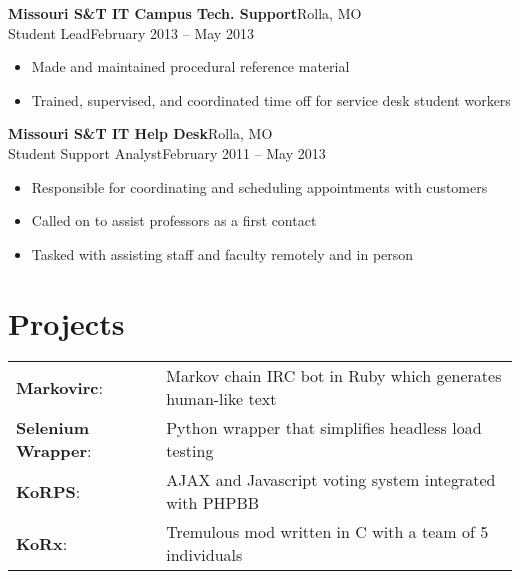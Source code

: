 \documentclass[margin]{res}
\newcommand{\github}[0]%
{%
  \hspace{-4mm}\faGithubSign\hspace{1mm}%
}
\begin{document}
\begin{resume}
       \textbf{Missouri S\&T IT Campus Tech. Support}\hfill  Rolla, MO\\
       Student Lead\hfill February 2013 -- May 2013
       \begin{itemize} \itemsep -1pt  %
         \item Made and maintained procedural reference material
         \item Trained, supervised, and coordinated time off for service desk student workers
       \end{itemize}
     
       \textbf{Missouri S\&T IT Help Desk}\hfill Rolla, MO\\
       Student Support Analyst\hfill February 2011 -- May 2013
       \begin{itemize} \itemsep -1pt  %
         \item Responsible for coordinating and scheduling appointments with customers
         \item Called on to assist professors as a first contact
         \item Tasked with assisting staff and faculty remotely and in person
       \end{itemize}

    \section{Projects} 
      \begin{tabular}{l p{4in}}
        \github\textbf{Markovirc}:            & Markov chain IRC bot in Ruby which generates human-like text \\ [1pt]
        \github\textbf{Selenium Wrapper}:     & Python wrapper that simplifies headless load testing \\ [1pt]
        \textbf{KoRPS}:                       & AJAX and Javascript voting system integrated with PHPBB \\ [1pt]
        \textbf{KoRx}:                        & Tremulous mod written in C with a team of 5 individuals \\ [1pt]
      \end{tabular}


\end{resume}
\end{document}
